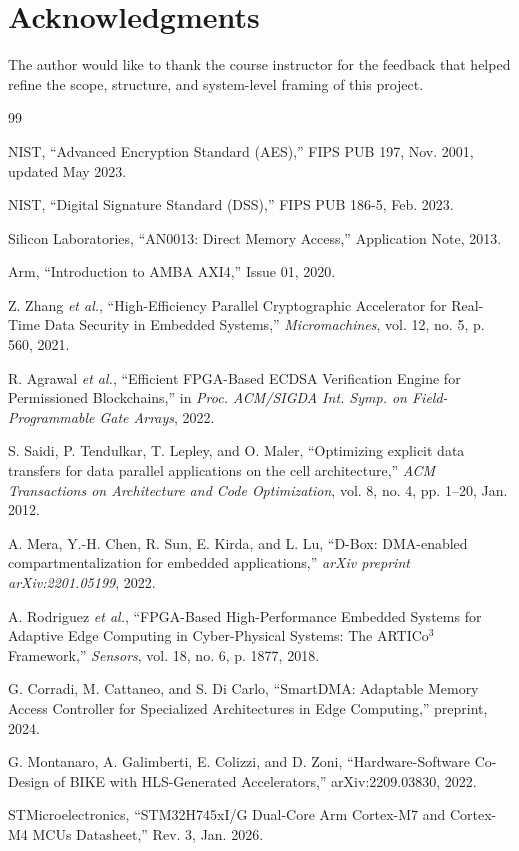 \documentclass[conference]{IEEEtran}
\begin{document}
\section*{Acknowledgments}
The author would like to thank the course instructor for the feedback that helped refine the scope, structure, and system-level framing of this project.

\small
\begin{thebibliography}{99}

NIST, ``Advanced Encryption Standard (AES),'' FIPS PUB 197, Nov. 2001, updated May 2023.

NIST, ``Digital Signature Standard (DSS),'' FIPS PUB 186-5, Feb. 2023.

Silicon Laboratories, ``AN0013: Direct Memory Access,'' Application Note, 2013.

Arm, ``Introduction to AMBA AXI4,'' Issue 01, 2020.

Z. Zhang \emph{et al.}, ``High-Efficiency Parallel Cryptographic Accelerator for Real-Time Data Security in Embedded Systems,'' \emph{Micromachines}, vol. 12, no. 5, p. 560, 2021.

R. Agrawal \emph{et al.}, ``Efficient FPGA-Based ECDSA Verification Engine for Permissioned Blockchains,'' in \emph{Proc. ACM/SIGDA Int. Symp. on Field-Programmable Gate Arrays}, 2022.

S. Saidi, P. Tendulkar, T. Lepley, and O. Maler, ``Optimizing explicit data transfers for data parallel applications on the cell architecture,'' \emph{ACM Transactions on Architecture and Code Optimization}, vol. 8, no. 4, pp. 1--20, Jan. 2012.

A. Mera, Y.-H. Chen, R. Sun, E. Kirda, and L. Lu, ``D-Box: DMA-enabled compartmentalization for embedded applications,'' \emph{arXiv preprint arXiv:2201.05199}, 2022.

A. Rodriguez \emph{et al.}, ``FPGA-Based High-Performance Embedded Systems for Adaptive Edge Computing in Cyber-Physical Systems: The ARTICo$^3$ Framework,'' \emph{Sensors}, vol. 18, no. 6, p. 1877, 2018.

G. Corradi, M. Cattaneo, and S. Di Carlo, ``SmartDMA: Adaptable Memory Access Controller for Specialized Architectures in Edge Computing,'' preprint, 2024.

G. Montanaro, A. Galimberti, E. Colizzi, and D. Zoni, ``Hardware-Software Co-Design of BIKE with HLS-Generated Accelerators,'' arXiv:2209.03830, 2022.

STMicroelectronics, ``STM32H745xI/G Dual-Core Arm Cortex-M7 and Cortex-M4 MCUs Datasheet,'' Rev. 3, Jan. 2026.

\end{thebibliography}
\normalsize
\end{document}
